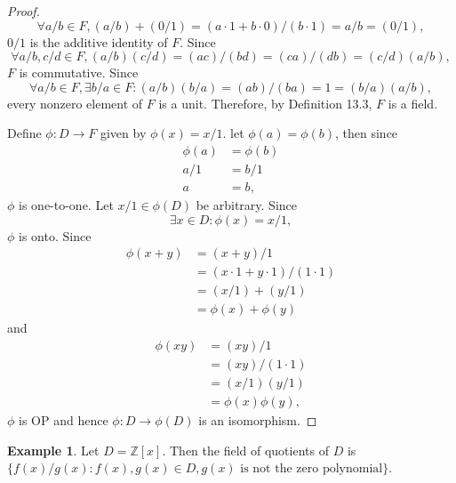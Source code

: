 \documentclass{article}
\theoremstyle{definition}
\newtheorem{example}{Example}[section]
\begin{document}
\begin{proof}
      \begin{equation*}
          \forall a/b \in F, (a/b)+(0/1)=(a\cdot1+b\cdot0)/(b\cdot1)=a/b=(0/1),
      \end{equation*}
      $0/1$ is the additive identity of $F$. Since
      \begin{equation*}
          \forall a/b, c/d \in F, (a/b)(c/d)=(ac)/(bd)=(ca)/(db)=(c/d)(a/b),
      \end{equation*}
      $F$ is commutative. Since
      \begin{equation*}
          \forall a/b \in F, \exists b/a \in F: (a/b)(b/a)=(ab)/(ba)=1=(b/a)(a/b),
      \end{equation*}
      every nonzero element of $F$ is a unit. Therefore, by Definition 13.3, $F$ is a field. 
      
      Define $\phi:D\to F$ given by $\phi(x)=x/1$. let $\phi(a)=\phi(b)$, then since
      \begin{align*}
          \phi(a)&=\phi(b) \\
          a/1&=b/1 \\
          a&=b,
      \end{align*}
      $\phi$ is one-to-one. Let $x/1\in\phi(D)$ be arbitrary. Since
      \begin{equation*}
          \exists x \in D: \phi(x)=x/1,
      \end{equation*}
      $\phi$ is onto. Since
      \begin{align*}
          \phi(x+y)&=(x+y)/1 \\
          &=(x\cdot1+y\cdot1)/(1\cdot1) \\
          &=(x/1)+(y/1) \\
          &=\phi(x)+\phi(y)
      \end{align*}
      and
      \begin{align*}
          \phi(xy)&=(xy)/1 \\
          &=(xy)/(1\cdot1) \\
          &=(x/1)(y/1) \\
          &=\phi(x)\phi(y),
      \end{align*}
      $\phi$ is OP and hence $\phi:D\to\phi(D)$ is an isomorphism.
\end{proof}

\begin{example}
    Let $D=\mathbb{Z}[x]$. Then the field of quotients of $D$ is $\{f(x)/g(x):f(x),g(x)\in D, g(x) \text{ is not the zero polynomial}\}$.
\end{example}
\end{document}
